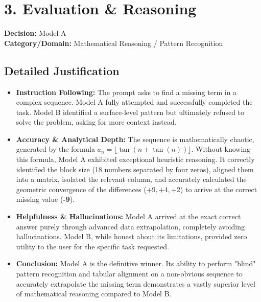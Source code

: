 \documentclass[11pt, a4paper]{article}
\begin{document}
\vspace{0.5cm}

\section*{3. Evaluation \& Reasoning}

\textbf{Decision:} Model A \\
\textbf{Category/Domain:} Mathematical Reasoning / Pattern Recognition

\subsection*{Detailed Justification}
\begin{itemize}[leftmargin=*]
    \item \textbf{Instruction Following:} The prompt asks to find a missing term in a complex sequence. Model A fully attempted and successfully completed the task. Model B identified a surface-level pattern but ultimately refused to solve the problem, asking for more context instead.
    \item \textbf{Accuracy \& Analytical Depth:} The sequence is mathematically chaotic, generated by the formula $a_n = \lfloor \tan(n+\tan(n)) \rfloor$. Without knowing this formula, Model A exhibited exceptional heuristic reasoning. It correctly identified the block size (18 numbers separated by four zeros), aligned them into a matrix, isolated the relevant column, and accurately calculated the geometric convergence of the differences ($+9, +4, +2$) to arrive at the correct missing value (\textbf{-9}). 
    \item \textbf{Helpfulness \& Hallucinations:} Model A arrived at the exact correct answer purely through advanced data extrapolation, completely avoiding hallucinations. Model B, while honest about its limitations, provided zero utility to the user for the specific task requested.
    \item \textbf{Conclusion:} Model A is the definitive winner. Its ability to perform "blind" pattern recognition and tabular alignment on a non-obvious sequence to accurately extrapolate the missing term demonstrates a vastly superior level of mathematical reasoning compared to Model B.
\end{itemize}
\end{document}
